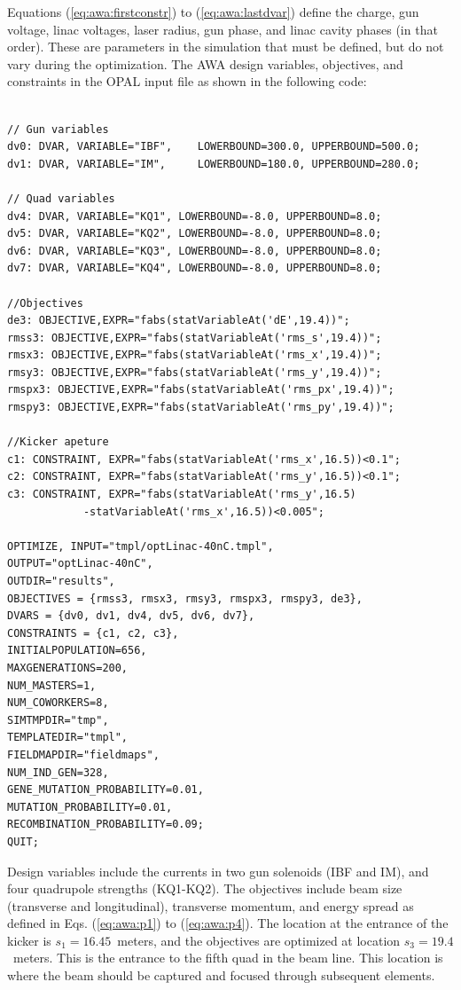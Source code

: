 Equations (\ref{eq:awa:firstconstr}) to
(\ref{eq:awa:lastdvar}) define the charge, gun voltage, linac voltages, 
laser radius, gun phase, and linac cavity phases (in that order). 
These are parameters in the simulation 
that must be defined, but do not vary during the optimization.
The AWA 
design variables, objectives, and constraints in the OPAL input file as shown in
the following code: %
\begin{Verbatim}[fontsize=\scriptsize]

// Gun variables 
dv0: DVAR, VARIABLE="IBF",    LOWERBOUND=300.0, UPPERBOUND=500.0;
dv1: DVAR, VARIABLE="IM",     LOWERBOUND=180.0, UPPERBOUND=280.0;

// Quad variables 
dv4: DVAR, VARIABLE="KQ1", LOWERBOUND=-8.0, UPPERBOUND=8.0;
dv5: DVAR, VARIABLE="KQ2", LOWERBOUND=-8.0, UPPERBOUND=8.0;
dv6: DVAR, VARIABLE="KQ3", LOWERBOUND=-8.0, UPPERBOUND=8.0;
dv7: DVAR, VARIABLE="KQ4", LOWERBOUND=-8.0, UPPERBOUND=8.0;

//Objectives
de3: OBJECTIVE,EXPR="fabs(statVariableAt('dE',19.4))";
rmss3: OBJECTIVE,EXPR="fabs(statVariableAt('rms_s',19.4))";
rmsx3: OBJECTIVE,EXPR="fabs(statVariableAt('rms_x',19.4))";
rmsy3: OBJECTIVE,EXPR="fabs(statVariableAt('rms_y',19.4))";
rmspx3: OBJECTIVE,EXPR="fabs(statVariableAt('rms_px',19.4))";
rmspy3: OBJECTIVE,EXPR="fabs(statVariableAt('rms_py',19.4))";

//Kicker apeture
c1: CONSTRAINT, EXPR="fabs(statVariableAt('rms_x',16.5))<0.1";
c2: CONSTRAINT, EXPR="fabs(statVariableAt('rms_y',16.5))<0.1";
c3: CONSTRAINT, EXPR="fabs(statVariableAt('rms_y',16.5)
			-statVariableAt('rms_x',16.5))<0.005";

OPTIMIZE, INPUT="tmpl/optLinac-40nC.tmpl",
OUTPUT="optLinac-40nC",
OUTDIR="results",
OBJECTIVES = {rmss3, rmsx3, rmsy3, rmspx3, rmspy3, de3},
DVARS = {dv0, dv1, dv4, dv5, dv6, dv7},
CONSTRAINTS = {c1, c2, c3},
INITIALPOPULATION=656,
MAXGENERATIONS=200,
NUM_MASTERS=1,
NUM_COWORKERS=8,
SIMTMPDIR="tmp",
TEMPLATEDIR="tmpl",
FIELDMAPDIR="fieldmaps",
NUM_IND_GEN=328,
GENE_MUTATION_PROBABILITY=0.01,
MUTATION_PROBABILITY=0.01,
RECOMBINATION_PROBABILITY=0.09;
QUIT;
\end{Verbatim}
\vspace{0.2cm}

Design variables include the currents in two gun solenoids (IBF and IM), 
and four quadrupole strengths (KQ1-KQ2). The objectives include
beam size (transverse and longitudinal), transverse momentum, and energy spread as
defined in Eqs. (\ref{eq:awa:p1}) to (\ref{eq:awa:p4}). 
The location at the entrance of the kicker is $s_1=16.45$~meters, 
and the objectives are optimized at location $s_3=19.4$~meters. 
This is the entrance to the fifth quad in the beam line. 
This location is where the beam should be captured and focused through subsequent elements.



